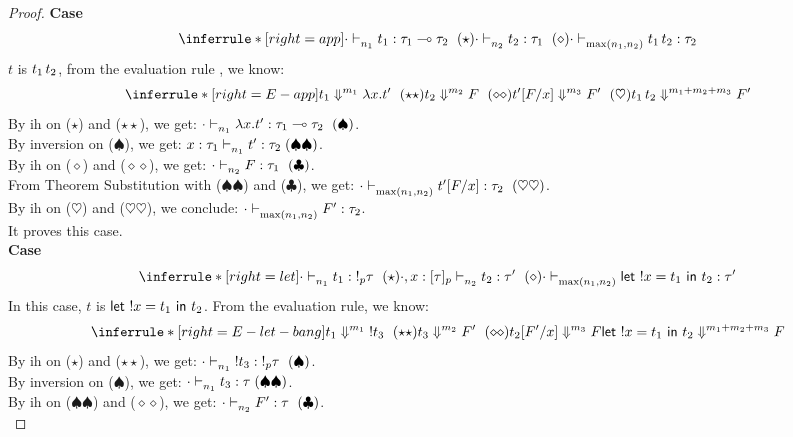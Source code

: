 \documentclass{article}
\begin{document}
\begin{proof}
   \noindent \textbf{Case}
   \[
   \inferrule*[ right = app ]
   {\cdot \jtype{n_1}{}{t_1}{\tau_1 \multimap \tau_2}~(\star) \\ \cdot \jtype{n_2}{}{t_2}{\tau_1}~(\diamond)}
   { \cdot \jtype{\max(n_1,n_2)}{}{\app{t_1}{t_2}}{\tau_2}  }
   \]
   $t$ is $\mathrel{ {t_1} \, {t_2} }$, from the evaluation rule , we know:
   \[
    \inferrule*[ right=E-app]
  {   
    { \eval{ t_1  }{ \abs{x}{t'}  }{m_1} ~(\star\star) }
    \\
    { \eval{ t_2  }{ F  }{m_2}~(\diamond\diamond) } 
    \\
    { \eval{t'[F/x] }{ F'}{m_3 }~(\heartsuit) }
  }
  { \eval{ \app{t_1}{t_2}  }{ F'  }{ m_1+m_2+m_3  } }
   \]
   By ih on ($\star$) and ($\star\star$), we get: $ \cdot \mathrel{\vdash_{n_1}^{} {\mathrel { \lambda {x} . {t'} }} : {\tau_1 \multimap \tau_2}}~(\spadesuit) $.\\
   By inversion on ($\spadesuit$), we get: $x:\tau_1 \mathrel{\vdash_{n_1}^{} {t'} : {\tau_2}}(\spadesuit\spadesuit)$.\\
  By ih on ($\diamond$) and ($\diamond\diamond$), we get: $ \cdot \mathrel{\vdash_{n_2}^{} {F} : {\tau_1}} ~(\clubsuit)$.\\
  From Theorem Substitution with ($\spadesuit\spadesuit$) and ($\clubsuit$), we get: $\cdot \mathrel{\vdash_{\max(n_1,n_2)}^{} {t'[F/x]} : {\tau_2}}~(\heartsuit\heartsuit) $.\\
  By ih on ($\heartsuit$) and ($\heartsuit\heartsuit$), we conclude: $ \cdot \mathrel{\vdash_{\max(n_1,n_2)}^{} {F'} : {\tau_2}}$.\\
  It proves this case.\\
  
   \noindent \textbf{Case}
   \[
   \inferrule*[ right = let ]
   {\cdot \jtype{n_1}{}{t_1}{!_p \tau}~(\star) \\ \cdot, x: [\tau]_p \jtype{n_2}{}{t_2}{\tau'}~(\diamond) }
   { \cdot \jtype{\max(n_1,n_2)}{}{\letx{!x}{t_1}{t_2}}{\tau'}  }
   \]
   In this case, $t$ is $\mathrel{ \mathsf{let}\ {!x} = {t_1} \ \mathsf{in} \ {t_2} } $. From the evaluation rule, we know:\\
   \[
   \inferrule*[ right=E-let-bang]
  {   
    { \eval{ t_1  }{ !t_3  }{m_1} ~(\star\star)} 
    \\
    {\eval{t_3}{F'}{m_2}~(\diamond\diamond) }
    \\
    { \eval{t_2[F'/x] }{ F}{m_3 } }
  }
  { \eval{  \letx{!x}{t_1}{t_2}  }{ F  }{ m_1+m_2+m_3  } }  
   \]
    By ih on ($\star$) and ($\star\star$), we get: $ \cdot \mathrel{\vdash_{n_1}^{} {!t_3 } : {!_p \tau}}~(\spadesuit) $.\\
     By inversion on ($\spadesuit$), we get: $\cdot \mathrel{\vdash_{n_1}^{} {t_3} : {\tau}}(\spadesuit\spadesuit)$.\\
   By ih on ($\spadesuit\spadesuit $) and ($\diamond\diamond$), we get: $ \cdot \mathrel{\vdash_{n_2}^{} {F'} : {\tau}} ~(\clubsuit)$.\\


\end{proof}
\end{document}
